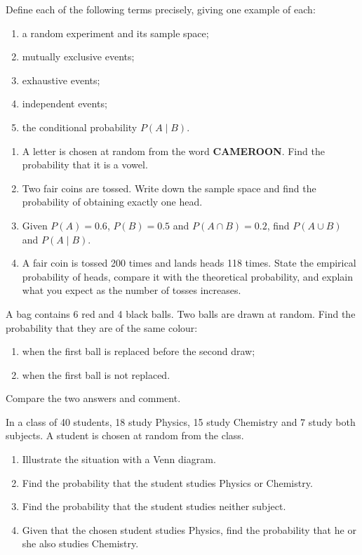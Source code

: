 \documentclass[11pt]{article}
\newcounter{popsec}
\newcounter{popsub}
\newcommand{\courssub}[1]{%
  \stepcounter{popsub}%
  \par\vspace{9pt}\noindent{\popxbold\fontsize{11.5}{13}\selectfont\color{popink}{\color{poporange}\thepopsec.\thepopsub}\hspace{6pt}#1}\par\nopagebreak\vspace{4pt}
}
\begin{document}
\begin{exercice}[Definitions]
Define each of the following terms precisely, giving one example of each:
\begin{enumerate}
\item a random experiment and its sample space;
\item mutually exclusive events;
\item exhaustive events;
\item independent events;
\item the conditional probability $P(A\mid B)$.
\end{enumerate}
\end{exercice}

\begin{exercice}
\begin{enumerate}
\item A letter is chosen at random from the word \textbf{CAMEROON}. Find the probability that it is a vowel.
\item Two fair coins are tossed. Write down the sample space and find the probability of obtaining exactly one head.
\item Given $P(A)=0.6$, $P(B)=0.5$ and $P(A\cap B)=0.2$, find $P(A\cup B)$ and $P(A\mid B)$.
\item A fair coin is tossed 200 times and lands heads 118 times. State the empirical probability of heads, compare it with the theoretical probability, and explain what you expect as the number of tosses increases.
\end{enumerate}
\end{exercice}

\courssub{I practise}

\begin{exercice}
A bag contains 6 red and 4 black balls. Two balls are drawn at random. Find the probability that they are of the same colour:
\begin{enumerate}
\item when the first ball is replaced before the second draw;
\item when the first ball is not replaced.
\end{enumerate}
Compare the two answers and comment.
\end{exercice}

\begin{exercice}
In a class of 40 students, 18 study Physics, 15 study Chemistry and 7 study both subjects. A student is chosen at random from the class.
\begin{enumerate}
\item Illustrate the situation with a Venn diagram.
\item Find the probability that the student studies Physics or Chemistry.
\item Find the probability that the student studies neither subject.
\item Given that the chosen student studies Physics, find the probability that he or she also studies Chemistry.
\end{enumerate}
\end{exercice}
\end{document}
